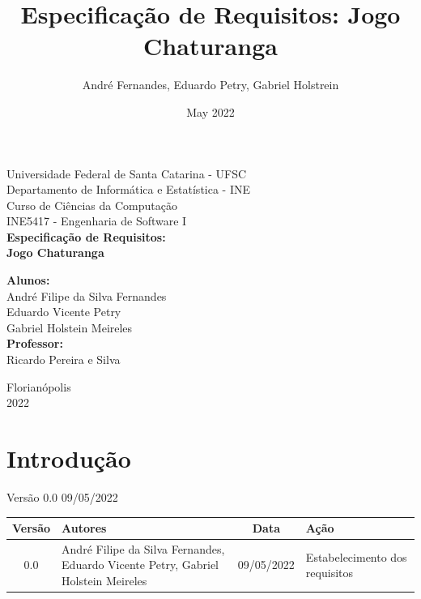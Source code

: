 \documentclass{article}
\title{Especificação de Requisitos: Jogo Chaturanga}
\author{André Fernandes, Eduardo Petry, Gabriel Holstrein}
\date{May 2022}
\begin{document}
\begin{titlepage}
\begin{center}
    {\large Universidade Federal de Santa Catarina - UFSC}\\[0.2cm]
    {\large Departamento de Informática e Estatística - INE}\\[0.2cm]
    {\large Curso de Ciências da Computação}\\[0.2cm]
    {\large INE5417 - Engenharia de Software I}\\[5.1cm]
    {\bf \huge Especificação de Requisitos: \\ Jogo Chaturanga}\\[5.1cm]
\end{center}

\begin{flushright}
    {\bf \large  Alunos:} \\
        André Filipe da Silva Fernandes \\
        Eduardo Vicente Petry \\
        Gabriel Holstein Meireles \\
    [0.7cm]
        
    {\bf \large Professor:}\\
        Ricardo Pereira e Silva \\
    [0.7cm]
\end{flushright}

\begin{center}
    {\large Florianópolis}\\[0.2cm]
    {\large 2022}
\end{center}

\end{titlepage} %
\pagebreak

\section{Introdução}

Versão 0.0
09/05/2022

\begin{center}
    \begin{tabular}{|c|p{5cm}|c|p{5cm}|}
    
    \hline
    Versão & Autores & Data & Ação \\

    \hline 
    0.0 &
    André Filipe da Silva Fernandes, Eduardo Vicente Petry, Gabriel Holstein Meireles &
    09/05/2022 &
    Estabelecimento dos requisitos \\
    
    \hline
    
    \end{tabular}
\end{center}
\end{document}
